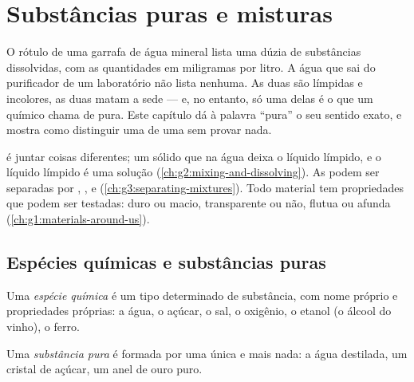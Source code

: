 \chapter{Substâncias puras e misturas}\label{ch:g6:pure-substances-and-mixtures}

O rótulo de uma garrafa de água mineral lista uma dúzia de substâncias
dissolvidas, com as quantidades em miligramas por litro. A água que sai
do purificador de um laboratório não lista nenhuma. As duas são límpidas
e incolores, as duas matam a sede --- e, no entanto, só uma delas é o
que um químico chama de pura. Este capítulo dá à palavra ``pura'' o seu
sentido exato, e mostra como distinguir uma  de uma
 sem provar nada.

\begin{recall}
 é juntar coisas diferentes; um sólido que  na água
deixa o líquido límpido, e o líquido límpido é uma solução
(\cref{ch:g2:mixing-and-dissolving}). As  podem ser separadas
por , ,  e 
(\cref{ch:g3:separating-mixtures}). Todo material tem propriedades que
podem ser testadas: duro ou macio, transparente ou não, flutua ou afunda
(\cref{ch:g1:materials-around-us}).
\end{recall}

\section{Espécies químicas e substâncias puras}

\begin{definition}\label{def:g6:pure-substances-and-mixtures:species}
Uma \emph{espécie química} é um tipo determinado
de substância, com nome próprio e propriedades próprias: a água, o
açúcar, o sal, o oxigênio, o etanol (o álcool do vinho), o ferro.
\end{definition}

\begin{definition}\label{def:g6:pure-substances-and-mixtures:pure-substance}
Uma \emph{substância pura} é formada por uma única
 e mais nada: a água destilada, um cristal de açúcar, um
anel de ouro puro.
\end{definition}

